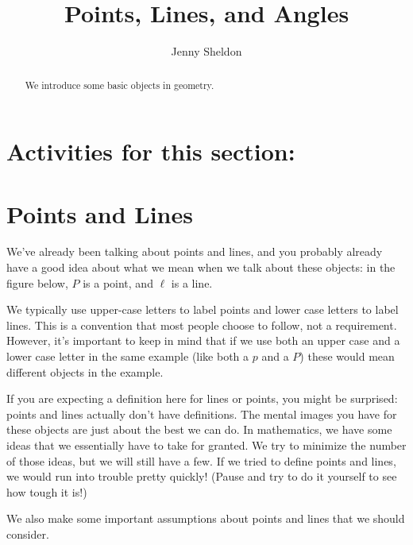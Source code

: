 \documentclass{ximera}
\title{Points, Lines, and Angles}
\author{Jenny Sheldon}
\begin{document}
\begin{abstract}
We introduce some basic objects in geometry.
\end{abstract}
\maketitle

\section{Activities for this section:} 

\section{Points and Lines}

We've already been talking about points and lines, and you probably already have a good idea about what we mean when we talk about these objects: in the figure below, $P$ is a point, and $\ell$ is a line. 
\begin{image}
\end{image}
We typically use upper-case letters to label points and lower case letters to label lines. This is a convention that most people choose to follow, not a requirement. However, it's important to keep in mind that if we use both an upper case and a lower case letter in the same example (like both a $p$ and a $P$) these would mean different objects in the example.

If you are expecting a definition here for lines or points, you might be surprised: points and lines actually don't have definitions. The mental images you have for these objects are just about the best we can do. In mathematics, we have some ideas that we essentially have to take for granted. We try to minimize the number of those ideas, but we will still have a few. If we tried to define points and lines, we would run into trouble pretty quickly! (Pause and try to do it yourself to see how tough it is!)

We also make some important assumptions about points and lines that we should consider.
\end{document}
